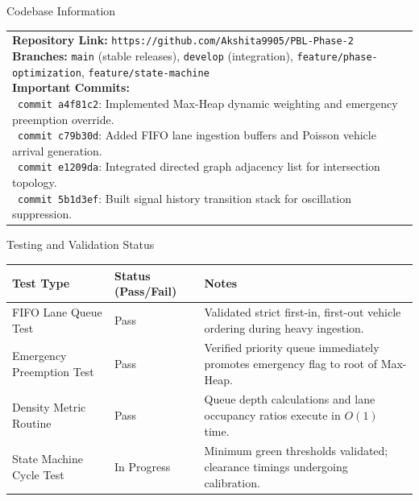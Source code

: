 \documentclass[12pt,a4paper]{article}
\newcommand{\sectiontitle}[1]{%
    {\color{GEUBlue}
    \fontsize{16.5}{20}\selectfont #1}
}
\newcommand{\instruction}[1]{%
    {\color{InstructionGrey}
    \fontsize{9.5}{12}\selectfont #1}
}
\newcommand{\answerbox}[2]{%
    \noindent
    \begin{tabularx}{\textwidth}{
        |>{\raggedright\arraybackslash}X|}
        \hline
        \parbox[t][#1][t]{\dimexpr\linewidth-12pt\relax}{
            \vspace{4pt}
            \fontsize{10}{13.5}\selectfont #2
        }\\
        \hline
    \end{tabularx}
}
\begin{document}
\newpage


\vspace*{0.05cm}

\sectiontitle{Codebase Information}

\vspace{0.03cm}

\instruction{

}

\vspace{0.15cm}

\answerbox{4.80cm}{\textbf{Repository Link:} \texttt{https://github.com/Akshita9905/PBL-Phase-2}\\[3pt]
\textbf{Branches:} \texttt{main} (stable releases), \texttt{develop} (integration), \texttt{feature/phase-optimization}, \texttt{feature/state-machine}\\[3pt]
\textbf{Important Commits:}\\
\textbullet~\texttt{commit a4f81c2}: Implemented Max-Heap dynamic weighting and emergency preemption override.\\
\textbullet~\texttt{commit c79b30d}: Added FIFO lane ingestion buffers and Poisson vehicle arrival generation.\\
\textbullet~\texttt{commit e1209da}: Integrated directed graph adjacency list for intersection topology.\\
\textbullet~\texttt{commit 5b1d3ef}: Built signal history transition stack for oscillation suppression.}

\vspace{0.40cm}

\sectiontitle{Testing and Validation Status}

\vspace{0.03cm}

\instruction{}

\vspace{0.15cm}

\begin{tabularx}{\textwidth}{
|>{\raggedright\arraybackslash}p{}
|>{\raggedright\arraybackslash}p{}
|>{\raggedright\arraybackslash}X|
}
\hline
\textbf{Test Type} & \textbf{Status (Pass/Fail)} & \textbf{Notes} \\
\hline
FIFO Lane Queue Test & Pass & Validated strict first-in, first-out vehicle ordering during heavy ingestion. \\
\hline
Emergency Preemption Test & Pass & Verified priority queue immediately promotes emergency flag to root of Max-Heap. \\
\hline
Density Metric Routine & Pass & Queue depth calculations and lane occupancy ratios execute in $O(1)$ time. \\
\hline
State Machine Cycle Test & In Progress & Minimum green thresholds validated; clearance timings undergoing calibration. \\
\hline
\end{tabularx}
\end{document}

